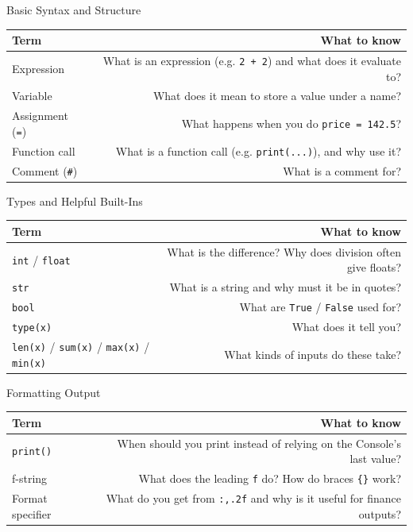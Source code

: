 \documentclass[9pt,aspectratio=169]{beamer}
\begin{document}
\begin{frame}{Basic Syntax and Structure}

\begin{tabular}{@{}lR@{}}
\toprule
\textbf{Term} & \textbf{What to know} \\
\midrule
\alert{Expression} & What is an expression (e.g. \texttt{2 + 2}) and what does it evaluate to? \\[0.8em]
\alert{Variable} & What does it mean to store a value under a name? \\[0.8em]
\alert{Assignment (\texttt{=})} & What happens when you do \texttt{price = 142.5}? \\[0.8em]
\alert{Function call} & What is a function call (e.g. \texttt{print(...)}), and why use it? \\[0.8em]
\alert{Comment (\texttt{\#})} & What is a comment for? \\
\bottomrule
\end{tabular}

\end{frame}


\begin{frame}{Types and Helpful Built-Ins}

\begin{tabular}{@{}lR@{}}
\toprule
\textbf{Term} & \textbf{What to know} \\
\midrule
\alert{\texttt{int} / \texttt{float}} & What is the difference? Why does division often give floats? \\[0.8em]
\alert{\texttt{str}} & What is a string and why must it be in quotes? \\[0.8em]
\alert{\texttt{bool}} & What are \texttt{True} / \texttt{False} used for? \\[0.8em]
\alert{\texttt{type(x)}} & What does it tell you? \\[0.8em]
\alert{\texttt{len(x)} / \texttt{sum(x)} / \texttt{max(x)} / \texttt{min(x)}} & What kinds of inputs do these take? \\
\bottomrule
\end{tabular}

\end{frame}


\begin{frame}{Formatting Output}

\begin{tabular}{@{}lR@{}}
\toprule
\textbf{Term} & \textbf{What to know} \\
\midrule
\alert{\texttt{print()}} & When should you print instead of relying on the Console's last value? \\[0.8em]
\alert{f-string} & What does the leading \texttt{f} do? How do braces \texttt{\{\}} work? \\[0.8em]
\alert{Format specifier} & What do you get from \texttt{:,.2f} and why is it useful for finance outputs? \\
\bottomrule
\end{tabular}

\end{frame}
\end{document}

